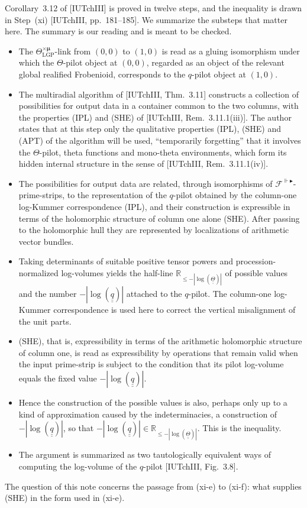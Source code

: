 \documentclass[11pt]{article}
\newcommand{\uu}[1]{\underline{\underline{#1}}}
\theoremstyle{definition}
\begin{document}
Corollary~3.12 of [IUTchIII] is proved in twelve steps, and the
inequality is drawn in Step~(xi) [IUTchIII, pp.~181--185].  We
summarize the substeps that matter here.  The summary is our
reading and is meant to be checked.
\begin{itemize}[leftmargin=4.2em,labelwidth=3.6em,labelsep=0.6em,align=left]
\item[(xi-a)] The $\Theta_{\mathrm{LGP}}^{\times\boldsymbol\mu}$-link
from $(0,0)$ to $(1,0)$ is read as a gluing isomorphism under which
the $\Theta$-pilot object at $(0,0)$, regarded as an object of the
relevant global realified Frobenioid, corresponds to the $q$-pilot
object at $(1,0)$.
\item[(xi-b)] The multiradial algorithm of [IUTchIII, Thm.~3.11]
constructs a collection of possibilities for output data in a
container common to the two columns, with the properties (IPL) and
(SHE) of [IUTchIII, Rem.~3.11.1(iii)].  The author states that at
this step only the qualitative properties (IPL), (SHE) and (APT) of
the algorithm will be used, ``temporarily forgetting'' that it
involves the $\Theta$-pilot, theta functions and mono-theta
environments, which form its hidden internal structure in the sense
of [IUTchIII, Rem.~3.11.1(iv)].
\item[(xi-c)] The possibilities for output data are related,
through isomorphisms of
$\mathcal F^{\Vdash\blacktriangleright}$-prime-strips, to the
representation of the $q$-pilot obtained by the column-one
log-Kummer correspondence (IPL), and their construction is
expressible in terms of the holomorphic structure of column one
alone (SHE).  After passing to the holomorphic hull they are
represented by localizations of arithmetic vector bundles.
\item[(xi-d)] Taking determinants of suitable positive tensor
powers and procession-normalized log-volumes yields the half-line
$\mathbb R_{\le-|\log(\uu\Theta)|}$ of possible values and the
number $-|\log(\uu q)|$ attached to the $q$-pilot.  The column-one
log-Kummer correspondence is used here to correct the vertical
misalignment of the unit parts.
\item[(xi-e)] (SHE), that is, expressibility in terms of the
arithmetic holomorphic structure of column one, is read as
expressibility by operations that remain valid when the input
prime-strip is subject to the condition that its pilot log-volume
equals the fixed value $-|\log(\uu q)|$.
\item[(xi-f)] Hence the construction of the possible values is also,
perhaps only up to a kind of approximation caused by the
indeterminacies, a construction of $-|\log(\uu q)|$, so that
$-|\log(\uu q)|\in\mathbb R_{\le-|\log(\uu\Theta)|}$.  This is the
inequality.
\item[(xi-g)] The argument is summarized as two tautologically
equivalent ways of computing the log-volume of the $q$-pilot
[IUTchIII, Fig.~3.8].
\end{itemize}
The question of this note concerns the passage from (xi-e) to
(xi-f): what supplies (SHE) in the form used in (xi-e).
\end{document}
